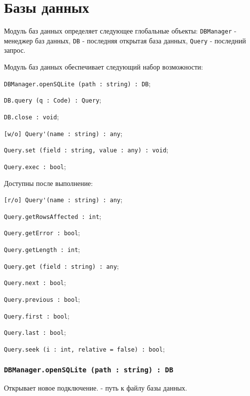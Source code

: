 \section{Базы данных}

Модуль баз данных определяет следующее глобальные объекты: \lstinline|DBManager| - менеджер баз данных, \lstinline|DB| - последняя открытая база данных, \lstinline|Query| - последний запрос.

Модуль баз данных обеспечивает следующий набор возможности:
\begin{icItems}
    \item \lstinline|DBManager.openSQLite (path : string) : DB|;
	\item \lstinline|DB.query (q : Code) : Query|;
	\item \lstinline|DB.close : void|;
	\item \lstinline|[w/o] Query'(name : string) : any|;
	\item \lstinline|Query.set (field : string, value : any) : void|;
	\item \lstinline|Query.exec : bool|;
	\item Доступны после выполнение:
	\begin{icItems}
	    \item \lstinline|[r/o] Query'(name : string) : any|;
		\item \lstinline|Query.getRowsAffected : int|;
		\item \lstinline|Query.getError : bool|;
		\item \lstinline|Query.getLength : int|;
		\item \lstinline|Query.get (field : string) : any|;
		\item \lstinline|Query.next : bool|;
		\item \lstinline|Query.previous : bool|;
		\item \lstinline|Query.first : bool|;
		\item \lstinline|Query.last : bool|;
		\item \lstinline|Query.seek (i : int, relative = false) : bool|;
	\end{icItems}
\end{icItems}

\subsubsection{\lstinline|DBManager.openSQLite (path : string) : DB|}

Открывает новое подключение.  - путь к файлу базы данных.


